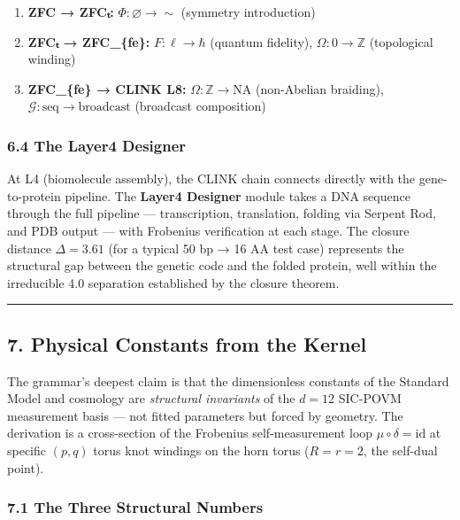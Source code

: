 \begin{enumerate}
\def\labelenumi{\arabic{enumi}.}
\tightlist
\item
  \textbf{ZFC → ZFCₜ:} \(\Phi: \varnothing \to \sim\) (symmetry
  introduction)
\item
  \textbf{ZFCₜ → ZFC\_\{fe\}:} \(F: \ell \to \hbar\) (quantum fidelity),
  \(\Omega: 0 \to \mathbb{Z}\) (topological winding)
\item
  \textbf{ZFC\_\{fe\} → CLINK L8:} \(\Omega: \mathbb{Z} \to \text{NA}\)
  (non-Abelian braiding),
  \(\mathcal{G}: \text{seq} \to \text{broadcast}\) (broadcast
  composition)
\end{enumerate}

\hypertarget{the-layer4-designer}{%
\subsubsection{6.4 The Layer4 Designer}\label{the-layer4-designer}}

At L4 (biomolecule assembly), the CLINK chain connects directly with the
gene-to-protein pipeline. The \textbf{Layer4 Designer} module takes a
DNA sequence through the full pipeline --- transcription, translation,
folding via Serpent Rod, and PDB output --- with Frobenius verification
at each stage. The closure distance \(\Delta = 3.61\) (for a typical 50
bp → 16 AA test case) represents the structural gap between the genetic
code and the folded protein, well within the irreducible 4.0 separation
established by the closure theorem.

\begin{center}\rule{0.5\linewidth}{0.5pt}\end{center}

\hypertarget{physical-constants-from-the-kernel}{%
\subsection{7. Physical Constants from the
Kernel}\label{physical-constants-from-the-kernel}}

The grammar's deepest claim is that the dimensionless constants of the
Standard Model and cosmology are \emph{structural invariants} of the
\(d=12\) SIC-POVM measurement basis --- not fitted parameters but forced
by geometry. The derivation is a cross-section of the Frobenius
self-measurement loop \(\mu \circ \delta = \text{id}\) at specific
\((p,q)\) torus knot windings on the horn torus (\(R = r = 2\), the
self-dual point).

\hypertarget{the-three-structural-numbers}{%
\subsubsection{7.1 The Three Structural
Numbers}\label{the-three-structural-numbers}}

